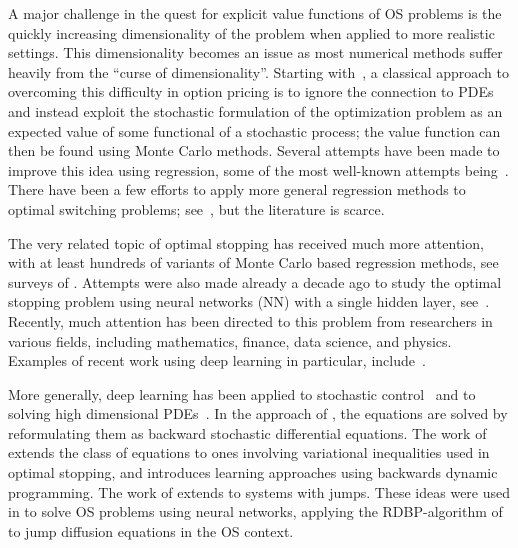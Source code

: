 \documentclass[11pt,reqno,a4paper]{amsart}
\theoremstyle{definition}
\numberwithin{equation}{section}
\DeclareMathOperator{\1}{\mathbbm{1}}
\begin{document}
A major challenge in the quest for explicit value functions of OS problems is the quickly increasing dimensionality of the problem when applied to more realistic settings. This dimensionality becomes an issue as most numerical methods suffer heavily from the ``curse of dimensionality''. Starting with~\cite{T93}, a classical approach to overcoming this difficulty in option pricing is to ignore the connection to PDEs and instead exploit the stochastic formulation of the optimization problem as an expected value of some functional of a stochastic process; the value function can then be found using Monte Carlo methods. Several attempts have been made to improve this idea using regression, some of the most well-known attempts being~\cite{BG97, C96, HK04, LS01, R02, TVR99}. There have been a few efforts to apply more general regression methods to optimal switching problems; see~\cite{carmona2008pricing,ACLP12,bayraktar2023neural,ludkovski2020simulation}, but the literature is scarce.

The very related topic of optimal stopping has received much more attention, with at least hundreds of variants of Monte Carlo based regression methods, see surveys of \cite{kohler2010review,nadarajah2017comparison}. Attempts were also made already a decade ago to study the optimal stopping problem using neural networks (NN) with a single hidden layer, see~\cite{K10}. Recently, much attention has been directed to this problem from researchers in various fields, including mathematics, finance, data science, and physics. Examples of recent work using deep learning in particular, include~\cite{BCJ19, BCJ21, BH21, EM21, FD21, H20, HKR21,reppen2025neural}.

More generally, deep learning has been applied to stochastic control~\cite{han2016deep} and to solving high dimensional PDEs~\cite{HJW18,sirignano2018dgm}. In the approach of \cite{HJW18}, the equations are solved by reformulating them as backward stochastic differential equations. The work of \cite{hure2020deep} extends the class of equations to ones involving variational inequalities used in optimal stopping, and introduces learning approaches using backwards dynamic programming. The work of \cite{gnoatto2022deep} extends \cite{HJW18} to systems with jumps. These ideas were used in \cite{bayraktar2023neural} to solve OS problems using neural networks, applying the RDBP-algorithm of \cite{hure2020deep} to jump diffusion equations in the OS context. 
\end{document}
